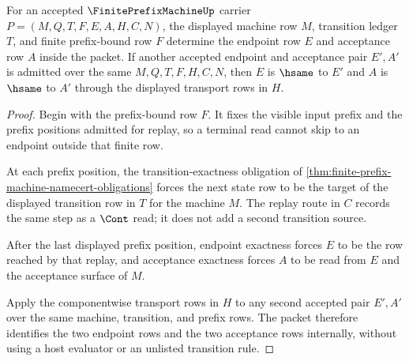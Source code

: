 \begin{theorem}
\label{thm:finite-prefix-machine-prefix-determinacy}
For an accepted $\FinitePrefixMachineUp$ carrier $P=(M,Q,T,F,E,A,H,C,N)$, the displayed machine row $M$, transition ledger $T$, and finite prefix-bound row $F$ determine the endpoint row $E$ and acceptance row $A$ inside the packet. If another accepted endpoint and acceptance pair $E',A'$ is admitted over the same $M,Q,T,F,H,C,N$, then $E$ is $\hsame$ to $E'$ and $A$ is $\hsame$ to $A'$ through the displayed transport rows in $H$.
\end{theorem}
\begin{proof}
Begin with the prefix-bound row $F$. It fixes the visible input prefix and the prefix positions admitted for replay, so a terminal read cannot skip to an endpoint outside that finite row.

At each prefix position, the transition-exactness obligation of \autoref{thm:finite-prefix-machine-namecert-obligations} forces the next state row to be the target of the displayed transition row in $T$ for the machine $M$. The replay route in $C$ records the same step as a $\Cont$ read; it does not add a second transition source.

After the last displayed prefix position, endpoint exactness forces $E$ to be the row reached by that replay, and acceptance exactness forces $A$ to be read from $E$ and the acceptance surface of $M$.

Apply the componentwise transport rows in $H$ to any second accepted pair $E',A'$ over the same machine, transition, and prefix rows. The packet therefore identifies the two endpoint rows and the two acceptance rows internally, without using a host evaluator or an unlisted transition rule.
\end{proof}

